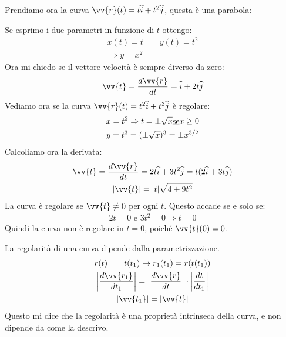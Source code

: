 \documentclass[a4paper, oneside]{article}
\begin{document}
\begin{example}
    Prendiamo ora la curva $\vv{r}(t) = t \widehat{i} + t^2 \widehat{j}$, questa è una parabola:
    \begin{center}
    \end{center}
    Se esprimo i due parametri in funzione di $t$ ottengo:
    \begin{gather*}
        x(t) = t \qquad y(t) = t^2\\
        \Rightarrow y = x^2
    \end{gather*}
    Ora mi chiedo se il vettore velocità è sempre diverso da zero:
    \begin{gather*}
        \vv{t} = \frac{d\vv{r}}{dt} = \widehat{i} + 2t \widehat{j}
    \end{gather*}
    Vediamo ora se la curva $\vv{r}(t) = t^2 \widehat{i} + t^3 \widehat{j}$ è regolare:
    \begin{gather*}
        x = t^2 \Rightarrow t = \pm \sqrt{x} \text{\underbar{se}} x \geq 0\\
        y = t^3 = (\pm \sqrt{x})^3 = \pm x^{3/2}
    \end{gather*}
    Calcoliamo ora la derivata:
    \begin{gather*}
        \vv{t} = \frac{d\vv{r}}{dt} = 2t \widehat{i} + 3t^2 \widehat{j} = t (2 \widehat{i} + 3t \widehat{j})\\
            |\vv{t}| = |t| \sqrt{4 + 9t^2}
    \end{gather*}
    La curva è regolare se $\vv{t} \neq 0$ per ogni $t$. Questo accade se e solo se:
    \begin{gather*}
        2t = 0 \text{ e } 3t^2 = 0 \Rightarrow t = 0
    \end{gather*}
    Quindi la curva non è regolare in $t=0$, poiché $\vv{t}(0) = 0$.
\end{example}
\begin{proposition}
    La regolarità di una curva  dipende dalla parametrizzazione.
    \begin{gather*}
        r(t) \qquad t(t_1) \to r_1(t_1) = r(t(t_1))\\
        \left\lvert \frac{d\vv{r_1}}{dt_1}\right\rvert  = \left\lvert \frac{d\vv{r}}{dt}\right\rvert  \cdot \left\lvert \frac{dt}{dt_1}\right\rvert \\
        \left\lvert \vv{t_1} \right\rvert = \left\lvert \vv{t} \right\rvert  
    \end{gather*}
    Questo mi dice che la regolarità è una proprietà intrinseca della curva, e non dipende da come la descrivo.
\end{proposition}
\end{document}
